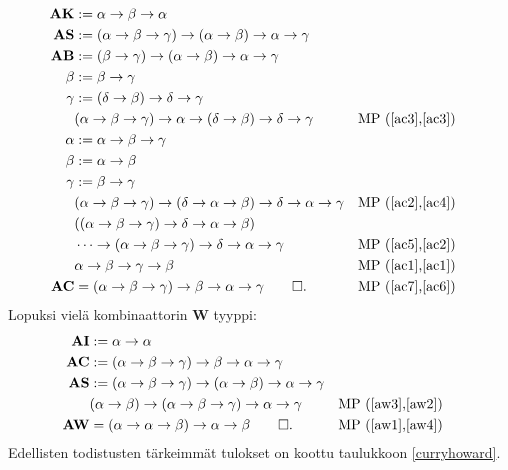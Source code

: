 \documentclass[a4paper,12pt]{amsart}
\begin{document}
\begin{align}
\mathbf{AK} &:= \alpha\to\beta\to\alpha \label{ac1} \\
\mathbf{AS} &:= (\alpha\to\beta\to\gamma)\to(\alpha\to\beta)\to\alpha\to\gamma \label{ac2} \\
\mathbf{AB} &:= (\beta\to\gamma)\to(\alpha\to\beta)\to\alpha\to\gamma \label{ac3} \\
\beta &:= \beta\to\gamma \\
\gamma &:= (\delta\to\beta)\to\delta\to\gamma \\
& (\alpha\to\beta\to\gamma)\to\alpha\to(\delta\to\beta)\to\delta\to\gamma && \text{MP (\ref{ac3},\ref{ac3})} \label{ac4} \\
\alpha &:= \alpha\to\beta\to\gamma \\
\beta &:= \alpha\to\beta \\
\gamma &:= \beta\to\gamma \\
& (\alpha\to\beta\to\gamma)\to(\delta\to\alpha\to\beta)\to\delta\to\alpha\to\gamma && \text{MP (\ref{ac2},\ref{ac4})} \label{ac5} \\
& ((\alpha\to\beta\to\gamma)\to\delta\to\alpha\to\beta)\\
& \cdots\to(\alpha\to\beta\to\gamma)\to\delta\to\alpha\to\gamma && \text{MP (\ref{ac5},\ref{ac2})} \label{ac6} \\
& \alpha\to\beta\to\gamma\to\beta && \text{MP (\ref{ac1},\ref{ac1})} \label{ac7} \\
\mathbf{AC} &= (\alpha\to\beta\to\gamma)\to\beta\to\alpha\to\gamma\qed. && \text{MP (\ref{ac7},\ref{ac6})}
\end{align}
Lopuksi vielä kombinaattorin $\mathbf{W}$ tyyppi:
\begin{align}
\mathbf{AI} &:= \alpha\to\alpha \label{aw1} \\
\mathbf{AC} &:= (\alpha\to\beta\to\gamma)\to\beta\to\alpha\to\gamma \label{aw2} \\
\mathbf{AS} &:= (\alpha\to\beta\to\gamma)\to(\alpha\to\beta)\to\alpha\to\gamma \label{aw3} \\
& (\alpha\to\beta)\to(\alpha\to\beta\to\gamma)\to\alpha\to\gamma && \text{MP (\ref{aw3},\ref{aw2})} \label{aw4} \\
\mathbf{AW} &= (\alpha\to\alpha\to\beta)\to\alpha\to\beta\qed. && \text{MP (\ref{aw1},\ref{aw4})}
\end{align}
Edellisten todistusten tärkeimmät tulokset on koottu taulukkoon \ref{curryhoward}.
\end{document}
